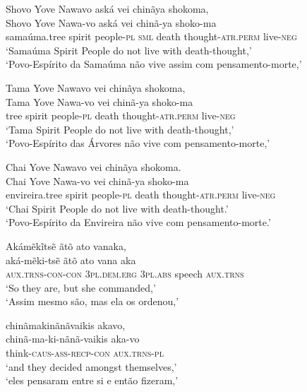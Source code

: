 \documentclass[output=paper,
modfonts,nonflat
]{langsci/langscibook}
\begin{document}
\ea Shovo Yove Nawavo aská vei chinãya shokoma, \\[.3em]
\gll Shovo        Yove   Nawa-vo            aská         vei   chinã-ya                  shoko-ma          \\
     samaúma.tree spirit people-\textsc{pl} \textsc{sml} death thought-\textsc{atr.perm} live-\textsc{neg} \\
\glt `Samaúma Spirit People do not live with death-thought,' \\
`Povo-Espírito da Samaúma não vive assim com pensamento-morte,'\\
\z

\ea Tama Yove Nawavo vei chinãya shokoma, \\[.3em]
\gll Tama Yove   Nawa-vo            vei   chinã-ya                  shoko-ma          \\
     tree spirit people-\textsc{pl} death thought-\textsc{atr.perm} live-\textsc{neg} \\
\glt `Tama Spirit People do not live with death-thought,' \\
`Povo-Espírito das Árvores não vive com pensamento-morte,'\\
\z

\ea Chai Yove Nawavo vei chinãya shokoma. \\[.3em]
\gll Chai           Yove   Nawa-vo            vei   chinã-ya                  shoko-ma          \\
     envireira.tree spirit people-\textsc{pl} death thought-\textsc{atr.perm} live-\textsc{neg} \\
\glt `Chai Spirit People do not live with death-thought.' \\
`Povo-Espírito da Envireira não vive com pensamento-morte.' \\
\z

\ea Akámẽkĩtsẽ ãtõ ato vanaka, \\[.3em]
\gll aká-mẽki-tsẽ              ãtõ                  ato              vana   aka               \\
     \textsc{aux.trns-con-con} \textsc{3pl.dem.erg} \textsc{3pl.abs} speech \textsc{aux.trns} \\
\glt `So they are, but she commanded,' \\
`Assim mesmo são, mas ela os ordenou,' \\
\z

\ea chinãmakinãnãvaikis akavo, \\[.3em]
\gll chinã-ma-ki-nãnã-vaikis          aka-vo               \\
     think-\textsc{caus-ass-recp-con} \textsc{aux.trns-pl} \\
\glt `and they decided amongst themselves,' \\
`eles pensaram entre si e então fizeram,' \\
\z
\end{document}

